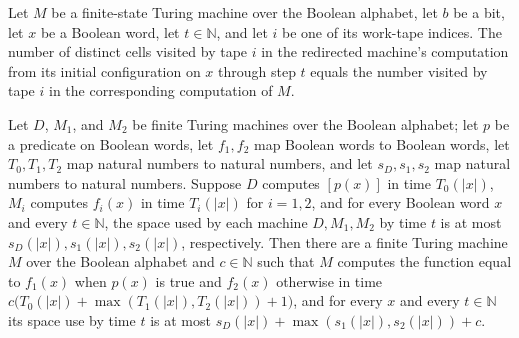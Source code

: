 \begin{theorem}
\label{Turing.FinTM.redirectTM_spaceUsedByTape}
\leanok
{}
Let $M$ be a finite-state Turing machine over the Boolean alphabet, let $b$ be a bit,
let $x$ be a Boolean word, let $t \in \mathbb{N}$, and let $i$ be one of its work-tape
indices. The number of distinct cells visited by tape $i$ in the redirected machine's
computation from its initial configuration on $x$ through step $t$ equals the number
visited by tape $i$ in the corresponding computation of $M$.
\end{theorem}

\begin{theorem}
\label{Turing.FinTM.computesFunInTime_cond_spaceUsed}
\leanok
{}
Let $D$, $M_1$, and $M_2$ be finite Turing machines over the Boolean alphabet; let $p$
be a predicate on Boolean words, let $f_1,f_2$ map Boolean words to Boolean words, let
$T_0,T_1,T_2$ map natural numbers to natural numbers, and let $s_D,s_1,s_2$ map natural
numbers to natural numbers. Suppose $D$ computes $[p(x)]$ in time $T_0(|x|)$, $M_i$
computes $f_i(x)$ in time $T_i(|x|)$ for $i=1,2$, and for every Boolean word $x$ and
every $t\in\mathbb{N}$, the space used by each machine $D,M_1,M_2$ by time $t$ is at
most $s_D(|x|),s_1(|x|),s_2(|x|)$, respectively. Then there are a finite Turing machine
$M$ over the Boolean alphabet and $c\in\mathbb{N}$ such that $M$ computes the function
equal to $f_1(x)$ when $p(x)$ is true and $f_2(x)$ otherwise in time
$c\bigl(T_0(|x|)+\max(T_1(|x|),T_2(|x|))+1\bigr)$, and for every $x$ and every
$t\in\mathbb{N}$ its space use by time $t$ is at most
$s_D(|x|)+\max(s_1(|x|),s_2(|x|))+c$.
\end{theorem}

